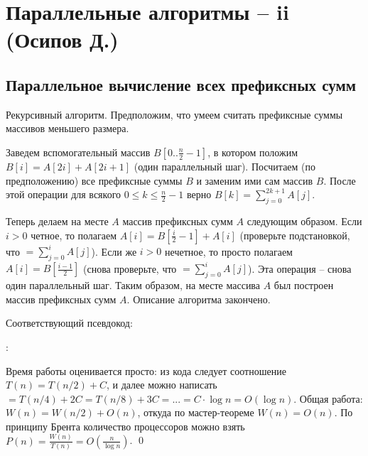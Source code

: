 \section{Параллельные алгоритмы -- ii (Осипов Д.)}
\subsection{Параллельное вычисление всех префиксных сумм}

 Рекурсивный алгоритм. Предположим, что умеем считать префиксные суммы массивов меньшего размера. 

Заведем вспомогательный массив $B[0..\frac{n}{2}-1]$, в котором положим $B[i]=A[2i]+A[2i+1]$ (один параллельный шаг). Посчитаем (по предположению) все префиксные суммы $B$ и заменим ими сам массив $B$. После этой операции для всякого $0 \leq k \leq \frac{n}{2}-1$ верно $B[k] = \sum_{j=0}^{2k+1} A[j]$. 

Теперь делаем на месте $A$ массив префиксных сумм $A$ следующим образом. Если $i > 0$ четное, то полагаем $A[i] = B[\frac{i}{2}-1] + A[i]$ (проверьте подстановкой, что $=\sum_{j=0}^{i}A[j]$). Если же $i > 0$ нечетное, то просто полагаем $A[i] = B[\frac{i-1}{2}]$ (снова проверьте, что $=\sum_{j=0}^{i}A[j]$). Эта операция -- снова один параллельный шаг. Таким образом, на месте массива $A$ был построен массив префиксных сумм $A$. Описание алгоритма закончено.

Соответствующий псевдокод:

\begin{algorithm}[H]

:\\
\end{algorithm}

Время работы оценивается просто: из кода следует соотношение $T(n) = T(n/2) + C$, и далее можно написать $= T(n/4) + 2C = T(n/8) + 3C = ... = C\cdot\log n = O(\log n)$. Общая работа: $W(n) = W(n/2) + O(n)$, откуда по мастер-теореме $W(n) = O(n)$. По принципу Брента количество процессоров можно взять $P(n) = \frac{W(n)}{T(n)} = O(\frac{n}{\log n})$. \qed

